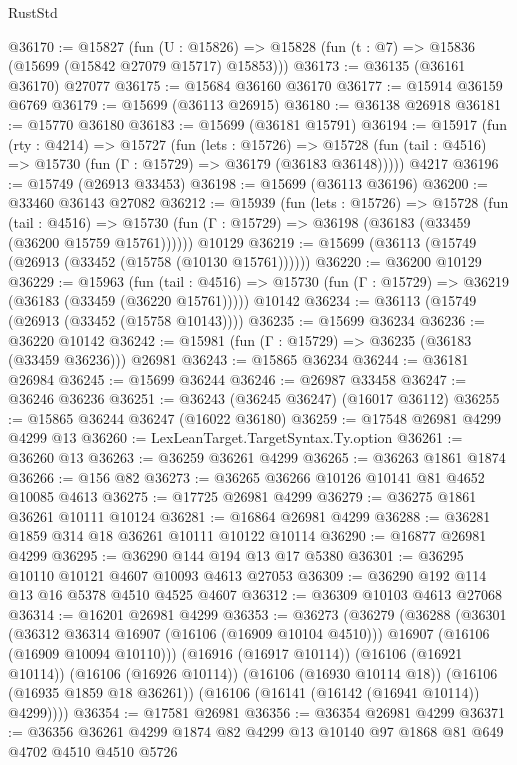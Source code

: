 \begin{lexlean}{RustStd}
\begin{coremodule}
@36170 := @15827
    (fun (U : @15826) => @15828 (fun (t : @7) => @15836 (@15699 (@15842 @27079 @15717) @15853)))
@36173 := @36135 (@36161 @36170) @27077
@36175 := @15684 @36160 @36170
@36177 := @15914 @36159 @6769
@36179 := @15699 (@36113 @26915)
@36180 := @36138 @26918
@36181 := @15770 @36180
@36183 := @15699 (@36181 @15791)
@36194 := @15917
    (fun (rty : @4214) =>
    @15727
      (fun (lets : @15726) =>
      @15728 (fun (tail : @4516) => @15730 (fun (Γ : @15729) => @36179 (@36183 @36148)))))
    @4217
@36196 := @15749 (@26913 @33453)
@36198 := @15699 (@36113 @36196)
@36200 := @33460 @36143 @27082
@36212 := @15939
    (fun (lets : @15726) =>
    @15728
      (fun (tail : @4516) =>
      @15730 (fun (Γ : @15729) => @36198 (@36183 (@33459 (@36200 @15759 @15761))))))
    @10129
@36219 := @15699 (@36113 (@15749 (@26913 (@33452 (@15758 (@10130 @15761))))))
@36220 := @36200 @10129
@36229 := @15963
    (fun (tail : @4516) => @15730 (fun (Γ : @15729) => @36219 (@36183 (@33459 (@36220 @15761)))))
    @10142
@36234 := @36113 (@15749 (@26913 (@33452 (@15758 @10143))))
@36235 := @15699 @36234
@36236 := @36220 @10142
@36242 := @15981 (fun (Γ : @15729) => @36235 (@36183 (@33459 @36236))) @26981
@36243 := @15865 @36234
@36244 := @36181 @26984
@36245 := @15699 @36244
@36246 := @26987 @33458
@36247 := @36246 @36236
@36251 := @36243 (@36245 @36247) (@16017 @36112)
@36255 := @15865 @36244 @36247 (@16022 @36180)
@36259 := @17548 @26981 @4299 @4299 @13
@36260 := LexLeanTarget.TargetSyntax.Ty.option
@36261 := @36260 @13
@36263 := @36259 @36261 @4299
@36265 := @36263 @1861 @1874
@36266 := @156 @82
@36273 := @36265 @36266 @10126 @10141 @81 @4652 @10085 @4613
@36275 := @17725 @26981 @4299
@36279 := @36275 @1861 @36261 @10111 @10124
@36281 := @16864 @26981 @4299
@36288 := @36281 @1859 @314 @18 @36261 @10111 @10122 @10114
@36290 := @16877 @26981 @4299
@36295 := @36290 @144 @194 @13 @17 @5380
@36301 := @36295 @10110 @10121 @4607 @10093 @4613 @27053
@36309 := @36290 @192 @114 @13 @16 @5378 @4510 @4525 @4607
@36312 := @36309 @10103 @4613 @27068
@36314 := @16201 @26981 @4299
@36353 := @36273
    (@36279
      (@36288
        (@36301
          (@36312 @36314 @16907 (@16106 (@16909 @10104 @4510)))
          @16907
          (@16106 (@16909 @10094 @10110)))
        (@16916 (@16917 @10114))
        (@16106 (@16921 @10114))
        (@16106 (@16926 @10114))
        (@16106 (@16930 @10114 @18))
        (@16106 (@16935 @1859 @18 @36261))
        (@16106 (@16141 (@16142 (@16941 @10114)) @4299))))
@36354 := @17581 @26981
@36356 := @36354 @26981 @4299
@36371 := @36356 @36261 @4299 @1874 @82 @4299 @13 @10140 @97 @1868 @81 @649 @4702 @4510 @4510 @5726

\end{coremodule}
\end{lexlean}
